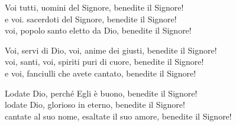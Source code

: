 \spazio

\strofa Voi tutti, uomini del Signore, benedite il Signore!\\
e voi. sacerdoti del Signore, benedite il Signore!\\
voi, popolo santo eletto da Dio, benedite il Signore!

\spazio


\spazio

\strofa Voi, servi di Dio, voi, anime dei giusti, benedite il Signore!\\
voi, santi, voi, spiriti puri di cuore, benedite il Signore!\\
e voi, fanciulli che avete cantato, benedite il Signore!

\spazio


\spazio

\strofa Lodate Dio, perché Egli è buono, benedite il Signore!\\	
lodate Dio, glorioso in eterno, benedite il Signore!\\
cantate al suo nome, esaltate il suo amore, benedite il Signore!

\spazio

